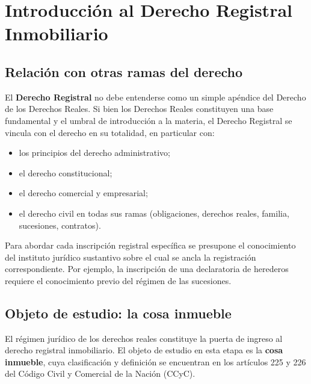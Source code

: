 \documentclass[12pt,oneside]{book}
\begin{document}
\tableofcontents

\clearpage


\chapter{Introducción al Derecho Registral Inmobiliario}

\section{Relación con otras ramas del derecho}

El \textbf{Derecho Registral} no debe entenderse como un simple apéndice del Derecho de los Derechos Reales. Si bien los Derechos Reales constituyen una base fundamental y el umbral de introducción a la materia, el Derecho Registral se vincula con el derecho en su totalidad, en particular con:

\begin{itemize}
\item los principios del derecho administrativo;
\item el derecho constitucional;
\item el derecho comercial y empresarial;
\item el derecho civil en todas sus ramas (obligaciones, derechos reales, familia, sucesiones, contratos).
\end{itemize}

Para abordar cada inscripción registral específica se presupone el conocimiento del instituto jurídico sustantivo sobre el cual se ancla la registración correspondiente. Por ejemplo, la inscripción de una declaratoria de herederos requiere el conocimiento previo del régimen de las sucesiones.

\section{Objeto de estudio: la cosa inmueble}

El régimen jurídico de los derechos reales constituye la puerta de ingreso al derecho registral inmobiliario. El objeto de estudio en esta etapa es la \textbf{cosa inmueble}, cuya clasificación y definición se encuentran en los artículos 225 y 226 del Código Civil y Comercial de la Nación (CCyC).

\end{document}
